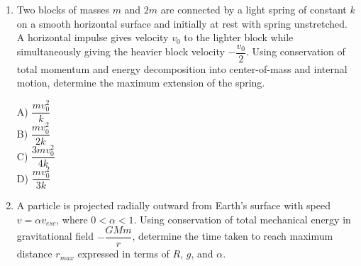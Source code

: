 \documentclass[12pt]{article}
\begin{document}
\begin{enumerate}
\begin{center}
\begin{tikzpicture}[scale=1]
\end{tikzpicture}
\end{center}

A) \(\sqrt{\omega^2-\dfrac{g^2}{\omega^2R^2}}\)\\

B) \(\sqrt{\omega^2-\dfrac{g}{R}}\)\\

C) \(\sqrt{\dfrac{g}{R}-\omega^2}\)\\

D) \(\sqrt{\omega^2+\dfrac{g}{R}}\)

\item Two blocks of masses \(m\) and \(2m\) are connected by a light spring of constant \(k\) on a smooth horizontal surface and initially at rest with spring unstretched. A horizontal impulse gives velocity \(v_0\) to the lighter block while simultaneously giving the heavier block velocity \(-\dfrac{v_0}{2}\). Using conservation of total momentum and energy decomposition into center-of-mass and internal motion, determine the maximum extension of the spring.\\

\begin{center}
\end{center}

A) \(\dfrac{mv_0^2}{k}\)\\

B) \(\dfrac{mv_0^2}{2k}\)\\

C) \(\dfrac{3mv_0^2}{4k}\)\\

D) \(\dfrac{mv_0^2}{3k}\)

\item A particle is projected radially outward from Earth’s surface with speed \(v=\alpha v_{esc}\), where \(0<\alpha<1\). Using conservation of total mechanical energy in gravitational field \(-\dfrac{GMm}{r}\), determine the time taken to reach maximum distance \(r_{max}\) expressed in terms of \(R\), \(g\), and \(\alpha\).\\




\end{enumerate}
\end{document}
